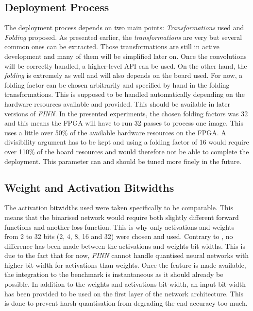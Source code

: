 
\subsection{Deployment Process}

The deployment process depends on two main points: \emph{Transformations} used and \emph{Folding} proposed. As presented earlier, the \emph{transformations} are very  but several common ones can be extracted. Those transformations are still in active development and many of them will be simplified later on. Once the convolutions will be correctly handled, a higher-level API can be used. On the other hand, the \emph{folding} is extremely  as well and will also depends on the board used. For now, a folding factor can be chosen arbitrarily and specified by hand in the folding transformations. This is supposed to be handled automatically depending on the hardware resources available and provided. This should be available in later versions of \emph{FINN}. In the presented experiments, the chosen folding factors was 32 and this means the FPGA will have to run 32 passes to process one image. This uses a little over 50\% of the available hardware resources on the FPGA. A divisibility argument has to be kept and using a folding factor of 16 would require over 110\% of the board resources and would therefore not be able to complete the deployment. This parameter can and should be tuned more finely in the future.


\subsection{Weight and Activation Bitwidths}

The activation bitwidths used were taken specifically to be comparable. This means that the binarised network would require both slightly different forward functions and another loss function. This is why only activations and weights from 2 to 32 bits (2, 4, 8, 16 and 32) were chosen and used. Contrary to \cite{Bacchus2020}, no difference has been made between the activations and weights bit-widths. This is due to the fact that for now, \emph{FINN} cannot handle quantised neural networks with higher bit-width for activations than weights. Once the feature is made available, the integration to the benchmark is instantaneous as it should already be possible. In addition to the weights and activations bit-width, an input bit-width has been provided to be used on the first layer of the network architecture. This is done to prevent harsh quantisation from degrading the end accuracy too much.

